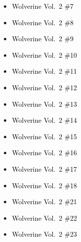 \documentclass[12pt]{article}
\newcommand{\checkbox}{\raisebox{0.0ex}{\fbox{\rule{0ex}{1.5ex} \rule{1.5ex}{0ex}}}}
\begin{document}
\vspace{0.3cm}
\noindent
\begin{tcolorbox}[
  colback=white!95!gray,
  colframe=black,
  width=\textwidth,
  arc=4mm,
  auto outer arc,
  boxrule=0.8pt,
  left=8pt,right=8pt,top=8pt,bottom=8pt
]
\begin{itemize}[left=0pt,label={\checkbox}]
  \item \textcolor{black}{Wolverine Vol.\ 2 \#7}
  \item \textcolor{black}{Wolverine Vol.\ 2 \#8}
  \item \textcolor{black}{Wolverine Vol.\ 2 \#9}
  \item \textcolor{black}{Wolverine Vol.\ 2 \#10}
  \item \textcolor{black}{Wolverine Vol.\ 2 \#11}
  \item \textcolor{black}{Wolverine Vol.\ 2 \#12}
  \item \textcolor{black}{Wolverine Vol.\ 2 \#13}
  \item \textcolor{black}{Wolverine Vol.\ 2 \#14}
  \item \textcolor{black}{Wolverine Vol.\ 2 \#15}
  \item \textcolor{black}{Wolverine Vol.\ 2 \#16}
  \item \textcolor{black}{Wolverine Vol.\ 2 \#17}
  \item \textcolor{black}{Wolverine Vol.\ 2 \#18}
  \item \textcolor{black}{Wolverine Vol.\ 2 \#21}
  \item \textcolor{black}{Wolverine Vol.\ 2 \#22}
  \item \textcolor{black}{Wolverine Vol.\ 2 \#23}
\end{itemize}
\end{tcolorbox}

\newpage
{}
\end{document}
